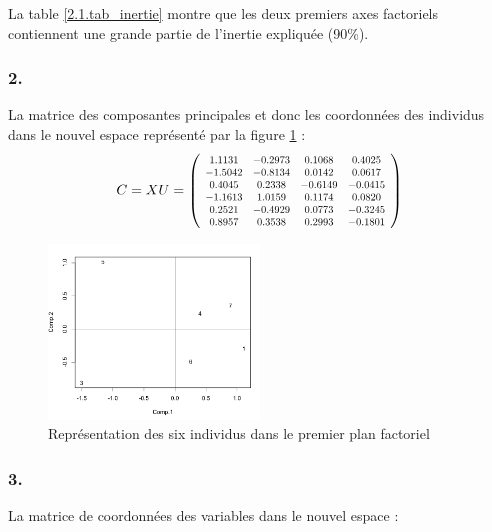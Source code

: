 \documentclass{article}
\newcommand\scalemath[2]{\scalebox{#1}{\mbox{\ensuremath{\displaystyle #2}}}} %
\begin{document}
La table \ref{2.1.tab_inertie} montre que les deux premiers axes factoriels contiennent une grande partie de l'inertie expliquée (90\%).

\subsubsection*{2.}
La matrice des composantes principales et donc les coordonnées des individus dans le nouvel espace représenté par la figure \ref{q.1.premier_plan_fac} :
\begin{equation}
C=XU=
\left(
\scalemath{0.75}{
	\begin{array}{cccc}
    1.1131& -0.2973&  0.1068&  0.4025\\
    -1.5042& -0.8134&  0.0142&  0.0617\\
    0.4045&  0.2338& -0.6149& -0.0415\\
    -1.1613&  1.0159&  0.1174&  0.0820\\
    0.2521& -0.4929&  0.0773& -0.3245\\
    0.8957&  0.3538&  0.2993& -0.1801\\
    \end{array}
}    
\right) 
\end{equation}

\begin{figure}[H]
\centering
\includegraphics[width=5.6cm]{./img/acp_premier_plan.png}
\caption{Représentation des six individus dans le premier plan factoriel}
\label{q.1.premier_plan_fac}
\end{figure}


\subsubsection*{3.}
La matrice de coordonnées des variables dans le nouvel espace :

\begin{table}[!ht]
\centering
\caption{Coordonnées des variables dans le nouvel espace}
\label{Table2.1.3}
\end{table}
\end{document}
